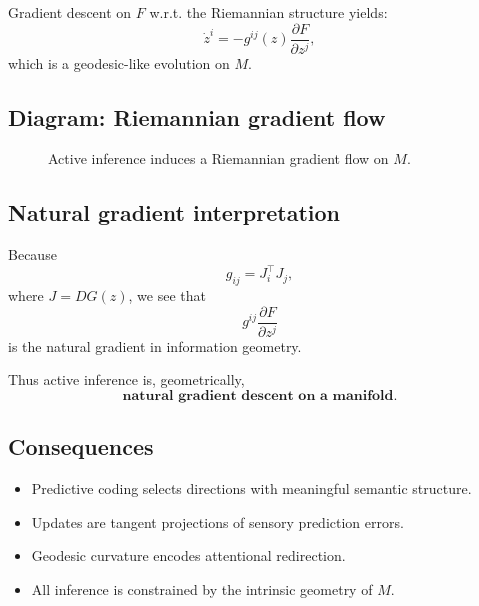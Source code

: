 \documentclass[11pt,a4paper,twocolumn]{article}
\begin{document}
Gradient descent on $F$ w.r.t. the Riemannian structure yields:
\[
\dot{z}^i = - g^{ij}(z) \frac{\partial F}{\partial z^j},
\]
which is a geodesic-like evolution on $M$.

\subsection{Diagram: Riemannian gradient flow}

\begin{figure}[H]
\centering
{}
\caption{Active inference induces a Riemannian gradient flow on $M$.}
\end{figure}

\subsection{Natural gradient interpretation}

Because
\[
g_{ij} = J_i^\top J_j,
\]
where $J = DG(z)$, we see that
\[
g^{ij} \frac{\partial F}{\partial z^j}
\]
is the natural gradient in information geometry.

Thus active inference is, geometrically,
\[
\textbf{natural gradient descent on a manifold.}
\]

\subsection{Consequences}

\begin{itemize}
\item Predictive coding selects directions with meaningful semantic
structure.
\item Updates are tangent projections of sensory prediction errors.
\item Geodesic curvature encodes attentional redirection.
\item All inference is constrained by the intrinsic geometry of $M$.
\end{itemize}

\end{document}
